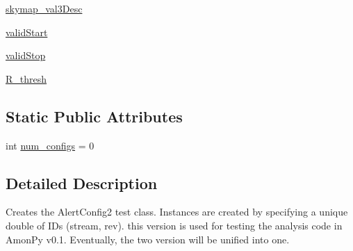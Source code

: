 \begin{DoxyCompactItemize}
\item 
\hyperlink{classamonpy_1_1dbase_1_1db__classes_1_1_alert_config2_a6c28894bd6690a2b0faeb36be8eb351f}{skymap\-\_\-val3\-Desc}
\item 
\hyperlink{classamonpy_1_1dbase_1_1db__classes_1_1_alert_config2_ac8bd043fc32dc2de20f5ee1cf57762e7}{valid\-Start}
\item 
\hyperlink{classamonpy_1_1dbase_1_1db__classes_1_1_alert_config2_a0338a9f4188da7e5b4e977a6d6a32dff}{valid\-Stop}
\item 
\hyperlink{classamonpy_1_1dbase_1_1db__classes_1_1_alert_config2_a94dabae815e574e6453b65d4efd9c0b0}{R\-\_\-thresh}
\end{DoxyCompactItemize}
\subsection*{Static Public Attributes}
\begin{DoxyCompactItemize}
\item 
int \hyperlink{classamonpy_1_1dbase_1_1db__classes_1_1_alert_config2_a17be669e8bdfa435ca0fe275a71479dd}{num\-\_\-configs} = 0
\end{DoxyCompactItemize}


\subsection{Detailed Description}
\begin{DoxyVerb}Creates the AlertConfig2 test class. Instances are created by
    specifying a unique double of IDs (stream, rev). this version is
    used for testing the analysis code in AmonPy v0.1. Eventually, the two
    version will be unified into one. 
\end{DoxyVerb}
 

